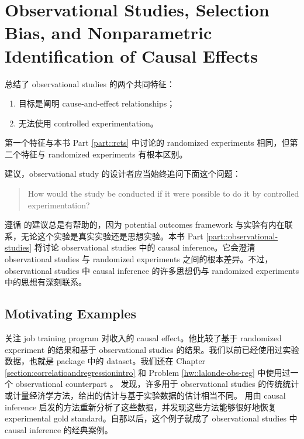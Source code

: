 \chapter{Observational Studies, Selection Bias, and Nonparametric Identification of Causal Effects}\label{chapter::observational-studies}

 
\citet{cochran1965planning} 总结了 observational studies 的两个共同特征：
\begin{enumerate}
\item
目标是阐明 cause-and-effect relationships；
\item 
无法使用 controlled experimentation。 
\end{enumerate}

第一个特征与本书 Part \ref{part::rcts} 中讨论的 randomized experiments 相同，但第二个特征与 randomized experiments 有根本区别。 


\citet{dorn1953philosophy} 建议，observational study 的设计者应当始终追问下面这个问题：
\begin{quote}
How would the study be conducted if it were possible to do
it by controlled experimentation?
\end{quote}
遵循 \citet{dorn1953philosophy} 的建议总是有帮助的，因为 potential outcomes framework 与实验有内在联系，无论这个实验是真实实验还是思想实验。本书 Part \ref{part::observational-studies} 将讨论 observational studies 中的 causal inference。它会澄清 observational studies 与 randomized experiments 之间的根本差异。不过，observational studies 中 causal inference 的许多思想仍与 randomized experiments 中的思想有深刻联系。 

 


\section{Motivating Examples}
 
 \begin{example}
 \label{eg::job-training-obs}
 \citet{lalonde1986evaluating} 关注 job training program 对收入的 causal effect。他比较了基于 randomized experiment 的结果和基于 observational studies 的结果。我们以前已经使用过实验数据，也就是  package 中的  dataset。我们还在 Chapter \ref{section:correlatioandregressionintro} 和 Problem \ref{hw::lalonde-obs-reg} 中使用过一个 observational counterpart 。\citet{lalonde1986evaluating} 发现，许多用于 observational studies 的传统统计或计量经济学方法，给出的估计与基于实验数据的估计相当不同。\cite{dehejia1999causal} 用由 causal inference 启发的方法重新分析了这些数据，并发现这些方法能够很好地恢复 experimental gold standard。自那以后，这个例子就成了 observational studies 中 causal inference 的经典案例。 
 \end{example}
 

